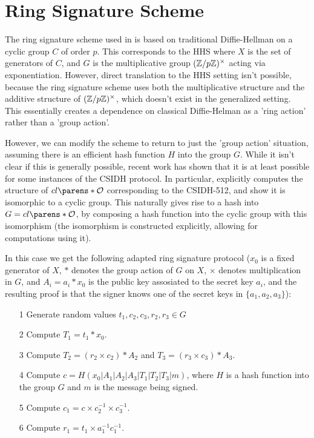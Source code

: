 \documentclass[11pt]{article}
\newcommand{\classgroup}{cl\parens*{\mathcal{O}}}
\begin{document}
\section*{Ring Signature Scheme}

The ring signature scheme used in \cite{deniableAKE} is based on traditional Diffie-Hellman on a cyclic group $C$ of order $p$.
This corresponds to the HHS where $X$ is the set of generators of $C$, and $G$ is the multiplicative group $(\mathbb{Z}/p\mathbb{Z})^\times$ acting via exponentiation.
However, direct translation to the HHS setting isn't possible, because the ring signature scheme uses both the multiplicative structure and the additive structure of $(\mathbb{Z}/p\mathbb{Z})^\times$, which doesn't exist in the generalized setting.
This essentially creates a dependence on classical Diffie-Helman as a 'ring action' rather than a 'group action'.

However, we can modify the scheme to return to just the 'group action' situation, assuming there is an efficient hash function $H$ into the group $G$.
While it isn't clear if this is generally possible, recent work has shown that it is at least possible for some instances of the CSIDH protocol.
In particular, \cite{explicitClassGroup} explicitly computes the structure of $\classgroup$ corresponding to the CSIDH-512, and show it is isomorphic to a cyclic group.
This naturally gives rise to a hash into $G = \classgroup$, by composing a hash function into the cyclic group with this isomorphism (the isomorphism is constructed explicitly, allowing for computations using it). 

In this case we get the following adapted ring signature protocol ($x_0$ is a fixed generator of $X$, $*$ denotes the group action of $G$ on $X$, $\times$ denotes multiplication in $G$, and $A_i = a_i * x_0$ is the public key assosiated to the secret key $a_i$, and the resulting proof is that the signer knows one of the secret keys in $\{a_1, a_2, a_3\}$):

\begin{itemize}
\item [1] Generate random values $t_1, c_2, c_3, r_2, r_3 \in G$
\item [2] Compute $T_1 = t_1 * x_0$.
\item [3] Compute $T_2 = (r_2 \times c_2) * A_2$ and $T_3 = (r_3 \times c_3) * A_3$.
\item [4] Compute $c = H(x_0 | A_1 | A_2 | A_3 | T_1 | T_2 | T_3 | m)$, where $H$ is a hash function into the group $G$ and $m$ is the message being signed.
\item [5] Compute $c_1 = c \times c_2^{-1} \times c_3^{-1}$.
\item [6] Compute $r_1 = t_1 \times a_1^{-1} c_1^{-1}$.
\end{itemize}
\end{document}
